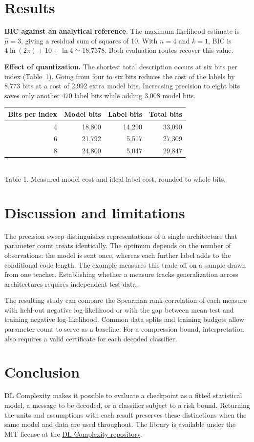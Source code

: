 \documentclass[10pt,a4paper]{article}
\begin{document}
\section{Results}
\textbf{BIC against an analytical reference.} The maximum-likelihood estimate is $\hat\mu=3$, giving a residual sum of squares of 10. With $n=4$ and $k=1$, BIC is $4\ln(2\pi)+10+\ln 4\simeq18.7378$. Both evaluation routes recover this value.

\textbf{Effect of quantization.} The shortest total description occurs at six bits per index (Table~1). Going from four to six bits reduces the cost of the labels by 8,773 bits at a cost of 2,992 extra model bits. Increasing precision to eight bits saves only another 470 label bits while adding 3,008 model bits.
\begin{center}
\small\begin{tabular}{rrrr}
\toprule Bits per index & Model bits & Label bits & Total bits\\\midrule
4 & 18,800 & 14,290 & 33,090\\
6 & 21,792 & 5,517 & 27,309\\
8 & 24,800 & 5,047 & 29,847\\\bottomrule
\end{tabular}\\[3pt]
Table 1. Measured model cost and ideal label cost, rounded to whole bits.
\end{center}
\section{Discussion and limitations}
The precision sweep distinguishes representations of a single architecture that parameter count treats identically. The optimum depends on the number of observations: the model is sent once, whereas each further label adds to the conditional code length. The example measures this trade-off on a sample drawn from one teacher. Establishing whether a measure tracks generalization across architectures requires independent test data.

The resulting study can compare the Spearman rank correlation of each measure with held-out negative log-likelihood or with the gap between mean test and training negative log-likelihood. Common data splits and training budgets allow parameter count to serve as a baseline. For a compression bound, interpretation also requires a valid certificate for each decoded classifier.
\section{Conclusion}
DL Complexity makes it possible to evaluate a checkpoint as a fitted statistical model, a message to be decoded, or a classifier subject to a risk bound. Returning the units and assumptions with each result preserves these distinctions when the same model and data are used throughout. The library is available under the MIT license at the \href{https://github.com/intsystems/dl-complexity}{DL Complexity repository}.
\small
\end{document}
